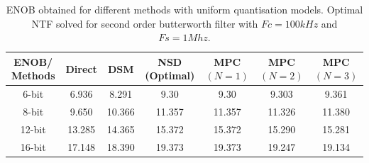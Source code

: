 \documentclass[a4paper]{article}
\begin{document}
\begin{table}[!h]
	\caption{ENOB obtained for different methods with uniform quantisation models. Optimal NTF solved for second order butterworth filter with $Fc = 100 \mathit{kHz}$ and $Fs = 1 \mathit{Mhz}$.}
	\centering
	\begin{tabular}{|c|c|c|c|c|c|c|}
	\hline
	ENOB/ Methods & Direct & DSM & NSD (Optimal) & MPC $(N = 1)$ & MPC $(N= 2)$ & MPC $(N= 3)$  \\
        \hline
        6-bit & 6.936 & 8.291 & 9.30  & 9.30 & 9.303 & 9.361\\
        \hline
        8-bit & 9.650 & 10.366 & 11.357  & 11.357 & 11.326 & 11.380\\
         \hline
        12-bit & 13.285 & 14.365 & 15.372  & 15.372 & 15.290 & 15.281\\
	\hline
	16-bit & 17.148 & 18.390 & 19.373  & 19.373 & 19.247& 19.134 \\
	\hline
	\end{tabular}		
\end{table}
\end{document}
